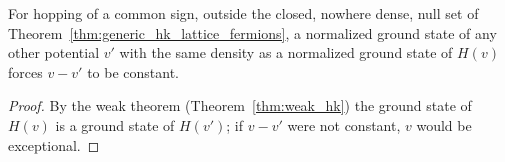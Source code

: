 \begin{theorem}
  \label{thm:density_determines_potential}
  \leanok
  For hopping of a common sign, outside the closed, nowhere dense, null set of
  Theorem~\ref{thm:generic_hk_lattice_fermions}, a normalized ground
  state of any other potential $v'$ with the same density as a normalized ground state of $H(v)$ forces $v-v'$ to be
  constant.
\end{theorem}
\begin{proof}
  \leanok
  By the weak theorem (Theorem~\ref{thm:weak_hk}) the ground state of $H(v)$ is a ground state of $H(v')$; if
  $v-v'$ were not constant, $v$ would be exceptional.
\end{proof}
